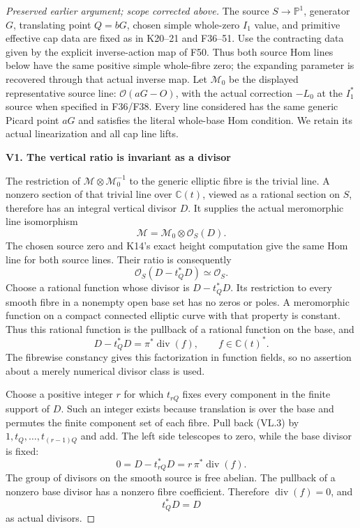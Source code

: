 \begin{proof}[Preserved earlier argument; scope corrected above]
The source \(S\to\mathbb P^1\), generator \(G\), translating point
\(Q=bG\), chosen simple whole-zero \(I_1\) value, and primitive
effective cap data are fixed as in K20--21 and F36--51.
Use the contracting data given by the explicit inverse-action map
of F50. Thus both source Hom lines below have the same positive
simple whole-fibre zero; the expanding parameter is recovered
through that actual inverse map.
Let \(\mathcal M_0\) be the displayed representative source line:
\(\mathcal O(aG-O)\), with the actual correction \(-L_0\) at
the \(I_1^*\) source when specified in F36/F38. Every line
considered has the same generic Picard point \(aG\) and satisfies
the literal whole-base Hom condition. We retain its actual
linearization and all cap line lifts.

\par

\medskip\noindent\textbf{V1. The vertical ratio is invariant as a divisor}

\par\nobreak

The restriction of \(\mathcal M\otimes\mathcal M_0^{-1}\) to the
generic elliptic fibre is the trivial line. A nonzero section of
that trivial line over \(\mathbb C(t)\), viewed as a rational
section on \(S\), therefore has an integral vertical divisor \(D\).
It supplies the actual meromorphic line isomorphism
\[
 \mathcal M=\mathcal M_0\otimes\mathcal O_S(D).
 \tag{VL.1}
\]
The chosen source zero and K14's exact height computation give
the same Hom line for both source lines. Their ratio is consequently
\[
 \mathcal O_S(D-t_Q^*D)\simeq\mathcal O_S.
 \tag{VL.2}
\]
Choose a rational function whose divisor is \(D-t_Q^*D\).
Its restriction to every smooth fibre in a nonempty open
base set has no zeros or poles. A meromorphic function on
a compact connected elliptic curve with that property is
constant. Thus this rational function is the pullback of
a rational function on the base, and
\[
 D-t_Q^*D=\pi^*\operatorname{div}(f),\qquad
                       f\in\mathbb C(t)^* .
 \tag{VL.3}
\]
The fibrewise constancy gives this factorization in function
fields, so no assertion about a merely numerical divisor
class is used.

Choose a positive integer \(r\) for which \(t_{rQ}\) fixes
every component in the finite support of \(D\). Such an
integer exists because translation is over the base and
permutes the finite component set of each fibre. Pull back
(VL.3) by \(1,t_Q,\ldots,t_{(r-1)Q}\) and add. The left
side telescopes to zero, while the base divisor is fixed:
\[
 0=D-t_{rQ}^*D=r\,\pi^*\operatorname{div}(f).
\]
The group of divisors on the smooth source is free abelian.
The pullback of a nonzero base divisor has a nonzero fibre
coefficient. Therefore \(\operatorname{div}(f)=0\), and
\[
                             t_Q^*D=D
 \tag{VL.4}
\]
as actual divisors.


\end{proof}
